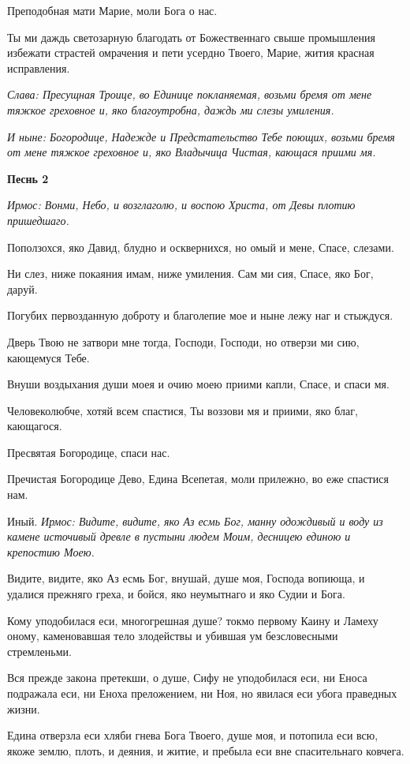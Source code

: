 Преподобная мати Марие, моли Бога о нас. 

Ты ми даждь светозарную благодать от Божественнаго свыше промышления избежати страстей омрачения и пети усердно Твоего, Марие, жития красная исправления. 

\itshape Слава\normalfont{}: Пресущная Троице, во Единице покланяемая, возьми бремя от мене тяжкое греховное и, яко благоутробна, даждь ми слезы умиления. 

\itshape И ныне\normalfont{}: Богородице, Надежде и Предстательство Тебе поющих, возьми бремя от мене тяжкое греховное и, яко Владычица Чистая, кающася приими мя. 

\medskip\bfseries Песнь 2\normalfont{}

\itshape Ирмос\normalfont{}: Вонми, Небо, и возглаголю, и воспою Христа, от Девы плотию пришедшаго. 

Поползохся, яко Давид, блудно и осквернихся, но омый и мене, Спасе, слезами. 

Ни слез, ниже покаяния имам, ниже умиления. Сам ми сия, Спасе, яко Бог, даруй. 

Погубих первозданную доброту и благолепие мое и ныне лежу наг и стыждуся. 

Дверь Твою не затвори мне тогда, Господи, Господи, но отверзи ми сию, кающемуся Тебе. 

Внуши воздыхания души моея и очию моею приими капли, Спасе, и спаси мя. 

Человеколюбче, хотяй всем спастися, Ты воззови мя и приими, яко благ, кающагося. 

Пресвятая Богородице, спаси нас. 

Пречистая Богородице Дево, Едина Всепетая, моли прилежно, во еже спастися нам. 

Иный. \itshape Ирмос\normalfont{}: Видите, видите, яко Аз есмь Бог, манну одождивый и воду из камене источивый древле в пустыни людем Моим, десницею единою и крепостию Моею. 

Видите, видите, яко Аз есмь Бог, внушай, душе моя, Господа вопиюща, и удалися прежняго греха, и бойся, яко неумытнаго и яко Судии и Бога. 

Кому уподобилася еси, многогрешная душе? токмо первому Каину и Ламеху оному, каменовавшая тело злодействы и убившая ум безсловесными стремленьми. 

Вся прежде закона претекши, о душе, Сифу не уподобилася еси, ни Еноса подражала еси, ни Еноха преложением, ни Ноя, но явилася еси убога праведных жизни. 

Едина отверзла еси хляби гнева Бога Твоего, душе моя, и потопила еси всю, якоже землю, плоть, и деяния, и житие, и пребыла еси вне спасительнаго ковчега. 

